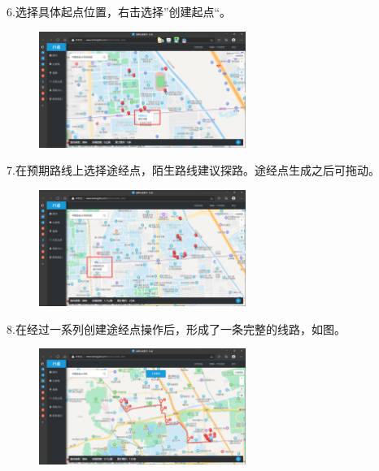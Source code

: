 \documentclass{ctexbook}
\begin{document}
6.选择具体起点位置，右击选择''创建起点``。
       \begin{figure}[H]
            \begin{center}
            \includegraphics[width=0.6\textwidth]{fig/行者6}
            \end{center}
        \end{figure}

7.在预期路线上选择途经点，陌生路线建议探路。途经点生成之后可拖动。
       \begin{figure}[H]
            \begin{center}
            \includegraphics[width=0.6\textwidth]{fig/行者7}
            \end{center}
        \end{figure}

8.在经过一系列创建途经点操作后，形成了一条完整的线路，如图。
       \begin{figure}[H]
            \begin{center}
            \includegraphics[width=0.6\textwidth]{fig/行者8}
            \end{center}
        \end{figure}
\end{document}
